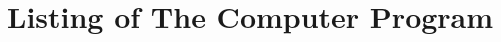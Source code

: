 \documentclass[11pt, a4paper]{article}
\begin{document}




\newpage
\appendix
\section{Listing of The Computer Program}

\end{document}

